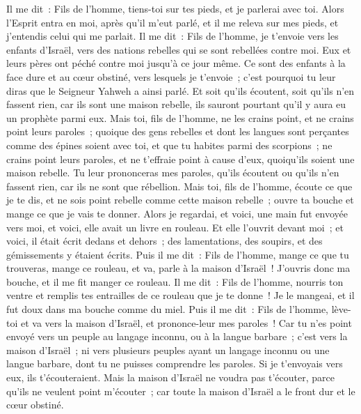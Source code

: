 \begin{multicols}{2}
\VerseOne{}Il me dit~: Fils de l'homme, tiens-toi sur tes pieds, et je parlerai avec toi.
Alors l'Esprit entra en moi, après qu'il m'eut parlé, et il me releva sur mes pieds, et j'entendis celui qui me parlait.
Il me dit~: Fils de l'homme, je t'envoie vers les enfants d'Israël, vers des nations rebelles qui se sont rebellées contre moi. Eux et leurs pères ont péché contre moi jusqu'à ce jour même.
Ce sont des enfants à la face dure et au cœur obstiné, vers lesquels je t'envoie~; c'est pourquoi tu leur diras que le Seigneur Yahweh a ainsi parlé.
Et soit qu'ils écoutent, soit qu'ils n'en fassent rien, car ils sont une maison rebelle, ils sauront pourtant qu'il y aura eu un prophète parmi eux.
Mais toi, fils de l'homme, ne les crains point, et ne crains point leurs paroles~; quoique des gens rebelles et dont les langues sont perçantes comme des épines soient avec toi, et que tu habites parmi des scorpions~; ne crains point leurs paroles, et ne t'effraie point à cause d'eux, quoiqu'ils soient une maison rebelle.
Tu leur prononceras mes paroles, qu'ils écoutent ou qu'ils n'en fassent rien, car ils ne sont que rébellion.
Mais toi, fils de l'homme, écoute ce que je te dis, et ne sois point rebelle comme cette maison rebelle~; ouvre ta bouche et mange ce que je vais te donner.
Alors je regardai, et voici, une main fut envoyée vers moi, et voici, elle avait un livre en rouleau.
Et elle l'ouvrit devant moi~; et voici, il était écrit dedans et dehors~; des lamentations, des soupirs, et des gémissements y étaient écrits.
\VerseOne{}Puis il me dit~: Fils de l'homme, mange ce que tu trouveras, mange ce rouleau, et va, parle à la maison d'Israël~!
J'ouvris donc ma bouche, et il me fit manger ce rouleau.
Il me dit~: Fils de l'homme, nourris ton ventre et remplis tes entrailles de ce rouleau que je te donne~! Je le mangeai, et il fut doux dans ma bouche comme du miel.
Puis il me dit~: Fils de l'homme, lève-toi et va vers la maison d'Israël, et prononce-leur mes paroles~!
Car tu n'es point envoyé vers un peuple au langage inconnu, ou à la langue barbare~; c'est vers la maison d'Israël~;
ni vers plusieurs peuples ayant un langage inconnu ou une langue barbare, dont tu ne puisses comprendre les paroles. Si je t'envoyais vers eux, ils t'écouteraient.
Mais la maison d'Israël ne voudra pas t'écouter, parce qu'ils ne veulent point m'écouter~; car toute la maison d'Israël a le front dur et le cœur obstiné.

\end{multicols}
